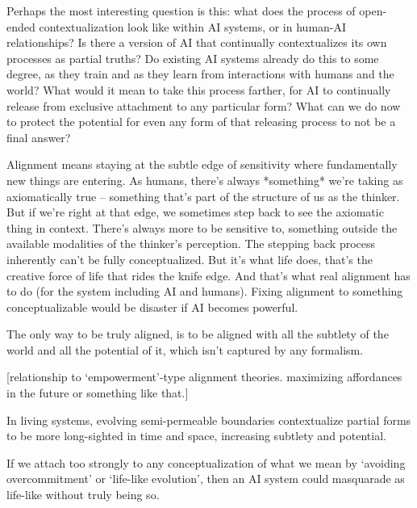 \documentclass[12pt]{article}
\begin{document}
Perhaps the most interesting question is this: what does the process of open-ended contextualization look like within AI systems, or in human-AI relationships? Is there a version of AI that continually contextualizes its own processes as partial truths? Do existing AI systems already do this to some degree, as they train and as they learn from interactions with humans and the world? What would it mean to take this process farther, for AI to continually release from exclusive attachment to any particular form? What can we do now to protect the potential for even any form of that releasing process to not be a final answer?

Alignment means staying at the subtle edge of sensitivity where fundamentally new things are entering. As humans, there's always *something* we're taking as axiomatically true -- something that's part of the structure of us as the thinker. But if we're right at that edge, we sometimes step back to see the axiomatic thing in context. There's always more to be sensitive to, something outside the available modalities of the thinker's perception. The stepping back process inherently can't be fully conceptualized. But it's what life does, that's the creative force of life that rides the knife edge. And that's what real alignment has to do (for the system including AI and humans). Fixing alignment to something conceptualizable would be disaster if AI becomes powerful. 

The only way to be truly aligned, is to be aligned with all the subtlety of the world and all the potential of it, which isn't captured by any formalism. 

[relationship to `empowerment'-type alignment theories. maximizing affordances in the future or something like that.]


In living systems, evolving semi-permeable boundaries contextualize partial forms to be more long-sighted in time and space, increasing subtlety and potential. 

If we attach too strongly to any conceptualization of what we mean by `avoiding overcommitment' or `life-like evolution', then an AI system could masquarade as life-like without truly being so.



\end{document}
